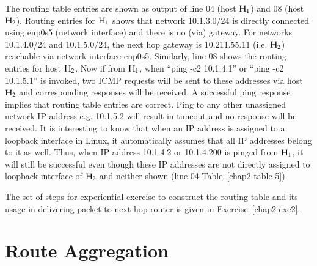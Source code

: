 \begin{multicols}{2}
The routing table entries are shown as output of line 04 (host ${\rm H}_{1}$) and 08 (host ${\rm H}_{2}$). Routing entries for ${\rm H}_{1}$ shows that network 10.1.3.0/24 is directly connected using enp0s5 (network interface) and there is no (via) gateway. For networks 10.1.4.0/24 and 10.1.5.0/24, the next hop gateway is 10.211.55.11 (i.e. ${\rm H}_{2}$) reachable via network interface enp0s5. Similarly, line 08 shows the routing entries for host ${\rm H}_{2}$. Now if from ${\rm H}_{1}$, when “ping -c2 10.1.4.1” or “ping -c2 10.1.5.1” is invoked, two ICMP requests will be sent to these addresses via host ${\rm H}_{2}$ and corresponding responses will be received. A successful ping response implies that routing table entries are correct. Ping to any other unassigned network IP address e.g. 10.1.5.2 will result in timeout and no response will be received. It is interesting to know that when an IP address is assigned to a loopback interface in Linux, it automatically assumes that all IP addresses belong to it as well. Thus, when IP address 10.1.4.2 or 10.1.4.200 is pinged from ${\rm H}_{1}$, it will still be successful even though these IP addresses are not directly assigned to loopback interface of ${\rm H}_{2}$ and neither shown (line 04 Table~\ref{chap2-table-5}).

The set of steps for experiential exercise to construct the routing table and its usage in delivering packet to next hop router is given in Exercise~\ref{chap2-exe2}.


\vspace{-.45cm}

\section{Route Aggregation}\label{chap2-sec5}

\vspace{-.1cm}


\end{multicols}
